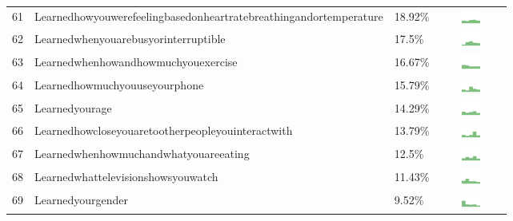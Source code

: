 \documentclass[a4paper,12pt]{article}
\begin{document}
\begin{longtable}{| p{0.5cm} | p{7cm} | p{1cm} | c |}
61 & Learnedhowyouwerefeelingbasedonheartratebreathingandortemperature & 18.92\% & \includegraphics[width = 2cm, height = 0.5cm]{learnedhowyouwerefeelingbasedonheartratebreathingandortemperatureAPPSERVER} \\ 
62 & Learnedwhenyouarebusyorinterruptible & 17.5\% & \includegraphics[width = 2cm, height = 0.5cm]{learnedwhenyouarebusyorinterruptibleAPPSERVER} \\ 
63 & Learnedwhenhowandhowmuchyouexercise & 16.67\% & \includegraphics[width = 2cm, height = 0.5cm]{learnedwhenhowandhowmuchyouexerciseAPPSERVER} \\ 
64 & Learnedhowmuchyouuseyourphone & 15.79\% & \includegraphics[width = 2cm, height = 0.5cm]{learnedhowmuchyouuseyourphoneAPPSERVER} \\ 
65 & Learnedyourage & 14.29\% & \includegraphics[width = 2cm, height = 0.5cm]{learnedyourageAPPSERVER} \\ 
66 & Learnedhowcloseyouaretootherpeopleyouinteractwith & 13.79\% & \includegraphics[width = 2cm, height = 0.5cm]{learnedhowcloseyouaretootherpeopleyouinteractwithAPPSERVER} \\ 
67 & Learnedwhenhowmuchandwhatyouareeating & 12.5\% & \includegraphics[width = 2cm, height = 0.5cm]{learnedwhenhowmuchandwhatyouareeatingAPPSERVER} \\ 
68 & Learnedwhattelevisionshowsyouwatch & 11.43\% & \includegraphics[width = 2cm, height = 0.5cm]{learnedwhattelevisionshowsyouwatchAPPSERVER} \\ 
69 & Learnedyourgender & 9.52\% & \includegraphics[width = 2cm, height = 0.5cm]{learnedyourgenderAPPSERVER} \\ 

\end{longtable}
\end{document}
